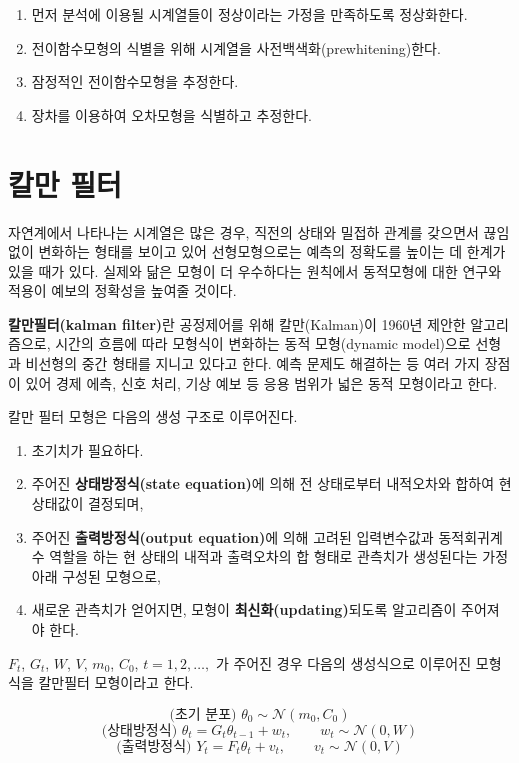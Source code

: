 \documentclass[b5paper,]{scrbook}
\theoremstyle{plain}
\theoremstyle{definition}
\numberwithin{equation}{section}
\begin{document}
\begin{enumerate}
\def\labelenumi{\arabic{enumi}.}
\item
  먼저 분석에 이용될 시계열들이 정상이라는 가정을 만족하도록 정상화한다.
\item
  전이함수모형의 식별을 위해 시계열을 사전백색화(prewhitening)한다.
\item
  잠정적인 전이함수모형을 추정한다.
\item
  장차를 이용하여 오차모형을 식별하고 추정한다.
\end{enumerate}

\chapter{칼만 필터}\label{kalman}

자연계에서 나타나는 시계열은 많은 경우, 직전의 상태와 밀접하 관계를
갖으면서 끊임없이 변화하는 형태를 보이고 있어 선형모형으로는 예측의
정확도를 높이는 데 한계가 있을 때가 있다. 실제와 닮은 모형이 더
우수하다는 원칙에서 동적모형에 대한 연구와 적용이 예보의 정확성을 높여줄
것이다.

\textbf{칼만필터(kalman filter)}란 공정제어를 위해 칼만(Kalman)이 1960년
제안한 알고리즘으로, 시간의 흐름에 따라 모형식이 변화하는 동적
모형(dynamic model)으로 선형과 비선형의 중간 형태를 지니고 있다고 한다.
예측 문제도 해결하는 등 여러 가지 장점이 있어 경제 에측, 신호 처리, 기상
예보 등 응용 범위가 넓은 동적 모형이라고 한다.

칼만 필터 모형은 다음의 생성 구조로 이루어진다.

\begin{enumerate}
\def\labelenumi{\arabic{enumi}.}
\item
  초기치가 필요하다.
\item
  주어진 \textbf{상태방정식(state equation)}에 의해 전 상태로부터
  내적오차와 합하여 현 상태값이 결정되며,
\item
  주어진 \textbf{출력방정식(output equation)}에 의해 고려된 입력변수값과
  동적회귀계수 역할을 하는 현 상태의 내적과 출력오차의 합 형태로
  관측치가 생성된다는 가정 아래 구성된 모형으로,
\item
  새로운 관측치가 얻어지면, 모형이 \textbf{최신화(updating)}되도록
  알고리즘이 주어져야 한다.
\end{enumerate}

\(F_{t}\), \(G_{t}\), \(W\), \(V\), \(m_{0}\), \(C_{0}\),
\(t=1,2,\ldots,\) 가 주어진 경우 다음의 생성식으로 이루어진 모형식을
칼만필터 모형이라고 한다.

\[\text{(초기 분포) } \theta_{0} \sim \mathcal{N}(m_{0},C_{0})\]
\[\text{(상태방정식) } \theta_{t}=G_{t}\theta_{t-1}+w_{t}, \qquad{w_{t} \sim \mathcal{N}(0,W)}\]
\[\text{(출력방정식) } Y_{t}=F_{t}\theta_{t}+v_{t}, \qquad{v_{t}\sim \mathcal{N}(0,V)}\]
\end{document}
